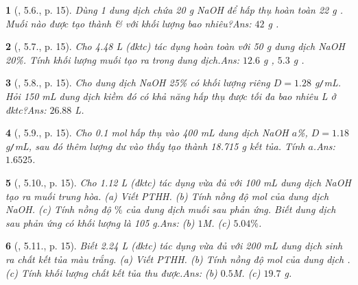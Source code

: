 \documentclass{article}
\newtheorem{baitoan}{}
\begin{document}
\begin{baitoan}[\cite{Truong_BTNC_Hoa_Hoc_9_2021}, 5.6., p. 15]
	Dùng 1 dung dịch chứa {\rm20 g NaOH} để hấp thụ hoàn toàn {\rm22 g }. Muối nào được tạo thành \& với khối lượng bao nhiêu?\hfill{\sf Ans: $42$ g .}
\end{baitoan}

\begin{baitoan}[\cite{Truong_BTNC_Hoa_Hoc_9_2021}, 5.7., p. 15]
	Cho {\rm4.48 L } (đktc) tác dụng hoàn toàn với {\rm50 g} dung dịch {\rm NaOH 20\%}. Tính khối lượng muối tạo ra trong dung dịch.\hfill{\sf Ans: $12.6$ g , $5.3$ g .}
\end{baitoan}

\begin{baitoan}[\cite{Truong_BTNC_Hoa_Hoc_9_2021}, 5.8., p. 15]
	Cho dung dịch {\rm NaOH 25\%} có khối lượng riêng $D = 1.28$ {\rm g{\tt/}mL}. Hỏi {\rm150 mL} dung dịch kiềm đó có khả năng hấp thụ được tối đa bao nhiêu {\rm L } ở đktc?\hfill{\sf Ans: $26.88$ L.}
\end{baitoan}

\begin{baitoan}[\cite{Truong_BTNC_Hoa_Hoc_9_2021}, 5.9., p. 15]
	Cho {\rm0.1 mol } hấp thụ vào {\rm400 mL} dung dịch {\rm NaOH $a$\%}, $D = 1.18$ {\rm g{\tt/}mL}, sau đó thêm lượng dư {\rm{}} vào thấy tạo thành {\rm18.715 g} kết tủa. Tính $a$.\hfill{\sf Ans: $1.6525$.}
\end{baitoan}

\begin{baitoan}[\cite{Truong_BTNC_Hoa_Hoc_9_2021}, 5.10., p. 15]
	Cho {\rm1.12 L } (đktc) tác dụng vừa đủ với {\rm100 mL} dung dịch {\rm NaOH} tạo ra muối trung hòa. (a) Viết {\rm PTHH}. (b) Tính nồng độ mol của dung dịch {\rm NaOH}. (c) Tính nồng độ $\%$ của dung dịch muối sau phản ứng. Biết dung dịch sau phản ứng có khối lượng là {\rm105 g}.\hfill{\sf Ans: (b) $1$M. (c) $5.04\%$.}
\end{baitoan}

\begin{baitoan}[\cite{Truong_BTNC_Hoa_Hoc_9_2021}, 5.11., p. 15]
	Biết {\rm2.24 L } (đktc) tác dụng vừa đủ với {\rm200 mL} dung dịch {\rm{}} sinh ra chất kết tủa màu trắng. (a) Viết {\rm PTHH}. (b) Tính nồng độ mol của dung dịch {\rm{}}. (c) Tính khối lượng chất kết tủa thu được.\hfill{\sf Ans: (b) $0.5$M. (c) $19.7$ g.}
\end{baitoan}
\end{document}
